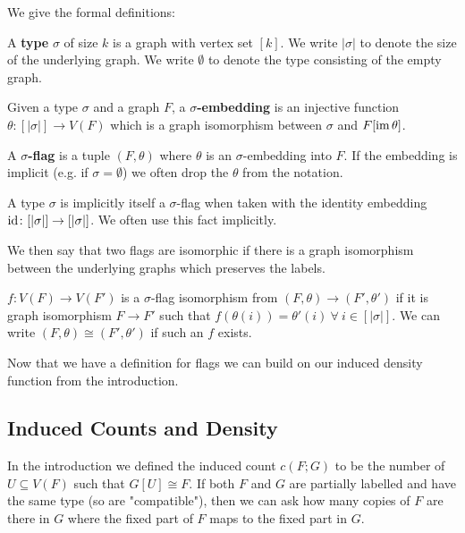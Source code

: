 We give the formal definitions:

\begin{definition}[Type]
    \label{def:type}
    A \textbf{type} $\sigma$ of size $k$ is a graph with vertex set $[k]$. We write
    $|\sigma|$ to denote the size of the underlying graph. We write
    $\emptyset$ to denote the type consisting of the empty graph.
\end{definition}
\begin{definition}
    Given a type $\sigma$ and a graph $F$, a \textbf{$\sigma$-embedding} is an injective
    function $\theta\colon[|\sigma|]\to V(F)$ which is a graph isomorphism between
    $\sigma$ and $F[\operatorname{im} \theta]$.
\end{definition}
\begin{definition}
    \label{def:sigma_flag}
    A \textbf{$\sigma$-flag} is a tuple $(F, \theta)$ where $\theta$ is an $\sigma$-embedding
    into $F$.
    If the embedding is implicit (e.g. if $\sigma=\emptyset$) we often drop the
    $\theta$ from the notation.
\end{definition}

\begin{note}
    A type $\sigma$ is implicitly itself a $\sigma$-flag when taken with the
    identity embedding $\mathrm{id}\colon [|\sigma|] \to [|\sigma|]$. We often use this fact
    implicitly.
\end{note}

We then say that two flags are isomorphic if there is a graph isomorphism between the underlying
graphs which preserves the labels.
\begin{definition}
    $f\colon V(F) \to V(F')$ is a $\sigma$-flag isomorphism
    from $(F,\theta) \to (F', \theta')$ if it is graph isomorphism $F \to F'$ such that
    $f(\theta(i)) = \theta'(i)\ \forall\ i\in [|\sigma|].$ We can
    write $(F,\theta)\cong (F',\theta')$ if such an $f$ exists.
\end{definition}

Now that we have a definition for flags we can build on our induced density function from
the introduction.

\subsection{Induced Counts and Density}

In the introduction we defined the induced count $c(F; G)$ to be the number of
$U\subseteq V(F)$ such that $G[U] \cong F$. If both $F$ and $G$ are partially labelled
and have the same type (so are "compatible"), then we
can ask how many copies of $F$ are there in $G$ where the fixed part of $F$ maps to the
fixed part in $G$.


